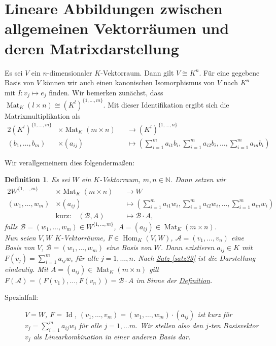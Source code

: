 \documentclass{report}
\newcommand{\N}{\mathbb{N}}
\newcommand{\baseb}{\mathcal{B}}
\newcommand{\basea}{\mathcal{A}}
\DeclareMathOperator{\Hom}{Hom}
\DeclareMathOperator{\Mat}{Mat}
\DeclareMathOperator{\Id}{Id}
\theoremstyle{customrem}
\theoremstyle{customdef}
\newtheorem{definition}{Definition}[chapter]
\begin{document}
\section{Lineare Abbildungen zwischen allgemeinen Vektorräumen und deren Matrixdarstellung}

Es sei \(V\) ein \(n\)-dimensionaler \(K\)-Vektorraum. Dann gilt \(V\cong K^n\). Für eine gegebene Basis von \(V\) können wir auch einen kanonischen Isomorphismus von \(V\) nach \(K^n\) mit \(I:v_j\mapsto e_j\) finden. Wir bemerken zunächst, dass \(\Mat_K(l\times n)\cong \left(K^l\right)^{\{1, \ldots, m\}}\). Mit dieser Identifikation ergibt sich die Matrixmultiplikation als
\begin{alignat*}{2}
	\left(K^l\right)^{\{1, \ldots, m\}} &\times \Mat_K(m\times n) &&\to \left(K^l\right)^{\{1, \ldots, n\}}\\
							  (b_1, \ldots, b_m) &\times (a_{ij}) &&\mapsto \left(\sum_{i=1}^{m}a_{i1}b_i, \sum_{i=1}^{m}a_{i2}b_i, \ldots, \sum_{i=1}^{m}a_{in}b_i\right)
\end{alignat*}

Wir verallgemeinern dies folgendermaßen:
	
	\begin{definition}
		\label{def45}
		Es sei \(W\) ein \(K\)-Vektorraum, \(m,n\in\N\). Dann setzen wir
		\begin{alignat*}{2}
			W^{\{1,\ldots, m\}} &\times \Mat_K(m\times n) &&\to W\\
			(w_1,\ldots, w_m) &\times (a_{ij}) &&\mapsto \left(\sum_{i=1}^{m}a_{i1}w_i, \sum_{i=1}^{m}a_{i2}w_i, \ldots, \sum_{i=1}^{m}a_{in}w_i\right)\\
			&\text{kurz:}\quad (\baseb, A) &&\mapsto \baseb\cdot A,
		\end{alignat*}
		falls \(\baseb=(w_1,\ldots, w_m)\in W^{\{1, \ldots, m\}}\), \(A=(a_{ij})\in\Mat_K(m\times n)\).\\
		
		Nun seien \(V,W\) \(K\)-Vektorräume, \(F\in\Hom_K(V,W)\), \(\basea = (v_1,\ldots, v_n)\) eine Basis von \(V\), \(\baseb=(w_1, \ldots, w_m)\) eine Basis von \(W\). Dann existieren \(a_{ij} \in K\) mit \(F(v_j) = \sum_{i=1}^{m}a_{ij}w_i\) für alle \(j=1,\ldots, n\). Nach \hyperref[satz33]{Satz \ref*{satz33}} ist die Darstellung eindeutig. Mit \(A=(a_{ij})\in\Mat_K(m\times n)\) gilt \(F(\basea) = (F(v_1), \ldots, F(v_n))=\baseb\cdot A\) im Sinne der \hyperref[def45]{Definition}. 
		\begin{description}
			\item[Spezialfall:] \(V=W\), \(F=\Id\), \((v_1, \ldots, v_m) =(w_1, \ldots, w_m)\cdot(a_{ij})\) ist kurz für \(v_j = \sum_{i=1}^{m}a_{ij}w_i\) für alle \(j=1,\ldots m\). Wir stellen also den \(j\)-ten Basisvektor \(v_j\) als Linearkombination in einer anderen Basis dar.
		\end{description}
	\end{definition}
	
\end{document}
